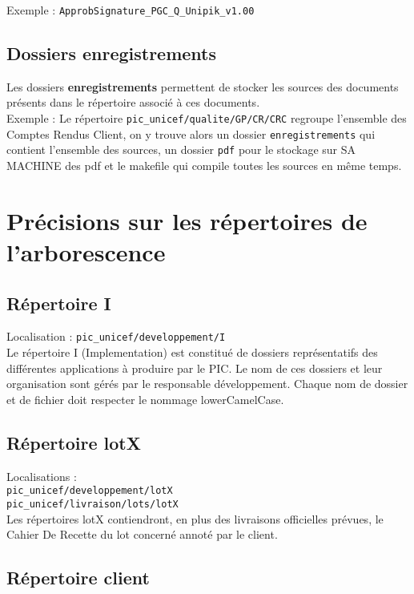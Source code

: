 Exemple : \verb+ApprobSignature_PGC_Q_Unipik_v1.00+

\subsection{Dossiers enregistrements}

Les dossiers \textbf{enregistrements} permettent de stocker les sources des documents présents dans le répertoire associé à ces documents.\\
Exemple : Le répertoire \verb+pic_unicef/qualite/GP/CR/CRC+ regroupe l'ensemble des Comptes Rendus Client, on y trouve alors un dossier \verb+enregistrements+ qui contient l'ensemble des sources, un dossier \verb+pdf+ pour le stockage sur SA MACHINE des pdf et le makefile qui compile toutes les sources en même temps.


\section{Précisions sur les répertoires de l'arborescence}

\subsection{Répertoire I}

Localisation : \verb+pic_unicef/developpement/I+\\

Le répertoire I (Implementation) est constitué de dossiers représentatifs des différentes applications à produire par le PIC. Le nom de ces dossiers et leur organisation sont gérés par le responsable développement. Chaque nom de dossier et de fichier doit respecter le nommage lowerCamelCase.

\subsection{Répertoire lotX}

Localisations : \\
\verb+pic_unicef/developpement/lotX+\\
\verb+pic_unicef/livraison/lots/lotX+\\

Les répertoires lotX contiendront, en plus des livraisons officielles prévues, le Cahier De Recette du lot concerné annoté par le client.

\subsection{Répertoire client}

